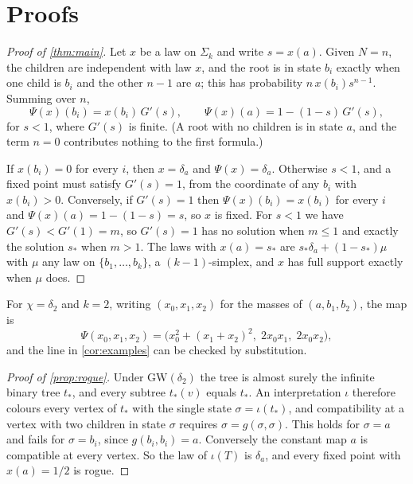 \documentclass[11pt]{amsart}
\theoremstyle{remark}
\newcommand{\GW}{\mathrm{GW}}
\begin{document}
\section{Proofs}\label{sec:proofs}

\begin{proof}[Proof of \cref{thm:main}]
Let $x$ be a law on $\Sigma_k$ and write $s=x(a)$. Given $N=n$, the children are independent with law $x$, and the root is in state $b_i$ exactly when one child is $b_i$ and the other $n-1$ are $a$; this has probability $n\,x(b_i)s^{n-1}$. Summing over $n$,
\[
\Psi(x)(b_i)=x(b_i)\,G'(s),\qquad \Psi(x)(a)=1-(1-s)\,G'(s),
\]
for $s<1$, where $G'(s)$ is finite. (A root with no children is in state $a$, and the term $n=0$ contributes nothing to the first formula.)

If $x(b_i)=0$ for every $i$, then $x=\delta_a$ and $\Psi(x)=\delta_a$. Otherwise $s<1$, and a fixed point must satisfy $G'(s)=1$, from the coordinate of any $b_i$ with $x(b_i)>0$. Conversely, if $G'(s)=1$ then $\Psi(x)(b_i)=x(b_i)$ for every $i$ and $\Psi(x)(a)=1-(1-s)=s$, so $x$ is fixed. For $s<1$ we have $G'(s)<G'(1)=m$, so $G'(s)=1$ has no solution when $m\le1$ and exactly the solution $s_*$ when $m>1$. The laws with $x(a)=s_*$ are $s_*\delta_a+(1-s_*)\mu$ with $\mu$ any law on $\{b_1,\dots,b_k\}$, a $(k-1)$-simplex, and $x$ has full support exactly when $\mu$ does.
\end{proof}

For $\chi=\delta_2$ and $k=2$, writing $(x_0,x_1,x_2)$ for the masses of $(a,b_1,b_2)$, the map is
\[
\Psi(x_0,x_1,x_2)=\bigl(x_0^2+(x_1+x_2)^2,\; 2x_0x_1,\; 2x_0x_2\bigr),
\]
and the line in \cref{cor:examples} can be checked by substitution.

\begin{proof}[Proof of \cref{prop:rogue}]
Under $\GW(\delta_2)$ the tree is almost surely the infinite binary tree $t_*$, and every subtree $t_*(v)$ equals $t_*$. An interpretation $\iota$ therefore colours every vertex of $t_*$ with the single state $\sigma=\iota(t_*)$, and compatibility at a vertex with two children in state $\sigma$ requires $\sigma=g(\sigma,\sigma)$. This holds for $\sigma=a$ and fails for $\sigma=b_i$, since $g(b_i,b_i)=a$. Conversely the constant map $a$ is compatible at every vertex. So the law of $\iota(T)$ is $\delta_a$, and every fixed point with $x(a)=1/2$ is rogue.
\end{proof}
\end{document}
